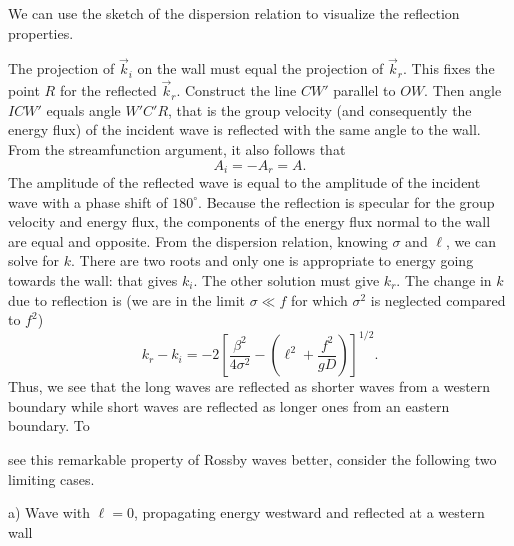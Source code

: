 We can use the sketch of the dispersion relation to visualize the reflection
properties.

\sourcepagebreak


The projection of $\vec k_i$ on the wall must equal the projection of $\vec k_r$. This
fixes the point $R$ for the reflected $\vec k_r$. Construct the line $CW'$ parallel to
$OW$. Then angle $ICW'$ equals angle $W'C'R$, that is the group velocity (and
consequently the energy flux) of the incident wave is reflected with the same angle to
the wall. From the streamfunction argument, it also follows that
\[
	A_i=-A_r=A.
\]
The amplitude of the reflected wave is equal to the amplitude of the incident wave with
a phase shift of $180^\circ$. Because the reflection is specular for the group velocity
and energy flux, the components of the energy flux normal to the wall are equal and
opposite. From the dispersion relation, knowing $\sigma$ and $\ell$, we can solve for
$k$. There are two roots and only one is appropriate to energy going towards the wall:
that gives $k_i$. The other solution must give $k_r$. The change in $k$ due to
reflection is (we are in the limit $\sigma\ll f$ for which $\sigma^2$ is neglected
compared to $f^2$)
\[
	k_r-k_i=-2\left[
		\frac{\beta^2}{4\sigma^2}
		-\left(\ell^2+\frac{f^2}{gD}\right)
		\right]^{1/2}.
\]
Thus, we see that the long waves are reflected as shorter waves from a western boundary
while short waves are reflected as longer ones from an eastern boundary. To

\sourcepagebreak

see this remarkable property of Rossby waves better, consider the following two
limiting cases.

\noindent a) Wave with $\ell=0$, propagating energy westward and reflected at a western
wall


